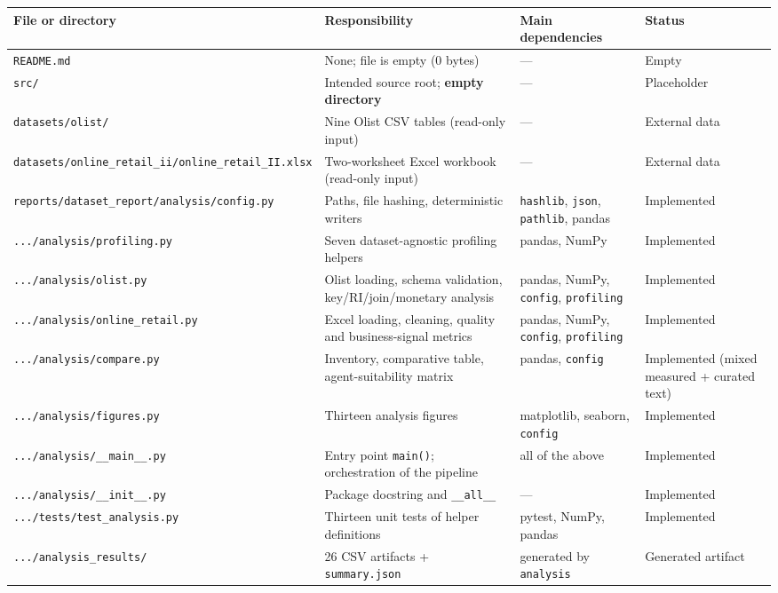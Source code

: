 \documentclass[11pt,a4paper]{article}
\newcommand{\code}[1]{\texttt{#1}}
\begin{document}
\begin{table}[H]
\centering
\footnotesize
\begin{tabularx}{\textwidth}{L{4.6cm}L{5.3cm}L{2.4cm}L{2.1cm}}
\toprule
\textbf{File or directory} & \textbf{Responsibility} & \textbf{Main dependencies} & \textbf{Status} \\
\midrule
\code{README.md} & None; file is empty (0 bytes) & --- & Empty \\
\code{src/} & Intended source root; \textbf{empty directory} & --- & Placeholder \\
\code{datasets/olist/} & Nine Olist CSV tables (read-only input) & --- & External data \\
\code{datasets/\allowbreak online\_retail\_ii/\allowbreak online\_retail\_II.xlsx} & Two-worksheet Excel workbook (read-only input) & --- & External data \\
\code{reports/\allowbreak dataset\_report/\allowbreak analysis/\allowbreak config.py} & Paths, file hashing, deterministic writers & \code{hashlib}, \code{json}, \code{pathlib}, pandas & Implemented \\
\code{.../analysis/profiling.py} & Seven dataset-agnostic profiling helpers & pandas, NumPy & Implemented \\
\code{.../analysis/olist.py} & Olist loading, schema validation, key/RI/join/monetary analysis & pandas, NumPy, \code{config}, \code{profiling} & Implemented \\
\code{.../analysis/online\_retail.py} & Excel loading, cleaning, quality and business-signal metrics & pandas, NumPy, \code{config}, \code{profiling} & Implemented \\
\code{.../analysis/compare.py} & Inventory, comparative table, agent-suitability matrix & pandas, \code{config} & Implemented (mixed measured + curated text) \\
\code{.../analysis/figures.py} & Thirteen analysis figures & matplotlib, seaborn, \code{config} & Implemented \\
\code{.../analysis/\_\_main\_\_.py} & Entry point \code{main()}; orchestration of the pipeline & all of the above & Implemented \\
\code{.../analysis/\_\_init\_\_.py} & Package docstring and \code{\_\_all\_\_} & --- & Implemented \\
\code{.../tests/test\_analysis.py} & Thirteen unit tests of helper definitions & pytest, NumPy, pandas & Implemented \\
\code{.../analysis\_results/} & 26 CSV artifacts + \code{summary.json} & generated by \code{analysis} & Generated artifact \\

\end{tabularx}
\end{table}
\end{document}
